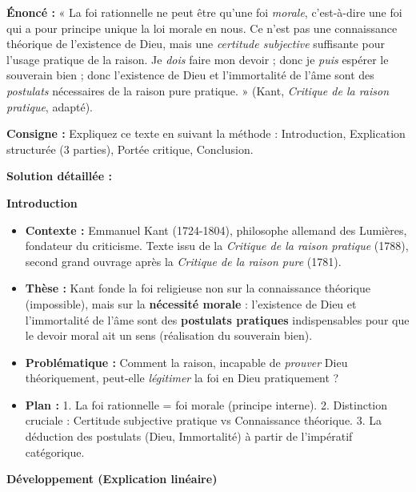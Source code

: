 \documentclass[11pt]{article}
\begin{document}
\begin{exoresolu}
\textbf{Énoncé :} « La foi rationnelle ne peut être qu'une foi \emph{morale}, c'est-à-dire une foi qui a pour principe unique la loi morale en nous. Ce n'est pas une connaissance théorique de l'existence de Dieu, mais une \emph{certitude subjective} suffisante pour l'usage pratique de la raison. Je \emph{dois} faire mon devoir ; donc je \emph{puis} espérer le souverain bien ; donc l'existence de Dieu et l'immortalité de l'âme sont des \emph{postulats} nécessaires de la raison pure pratique. » (Kant, \emph{Critique de la raison pratique}, adapté).

\textbf{Consigne :} Expliquez ce texte en suivant la méthode : Introduction, Explication structurée (3 parties), Portée critique, Conclusion.

\tcblower
\textbf{Solution détaillée :}

\textbf{Introduction}
\begin{itemize}
    \item \textbf{Contexte :} Emmanuel Kant (1724-1804), philosophe allemand des Lumières, fondateur du criticisme. Texte issu de la \emph{Critique de la raison pratique} (1788), second grand ouvrage après la \emph{Critique de la raison pure} (1781).
    \item \textbf{Thèse :} Kant fonde la foi religieuse non sur la connaissance théorique (impossible), mais sur la \textbf{nécessité morale} : l'existence de Dieu et l'immortalité de l'âme sont des \textbf{postulats pratiques} indispensables pour que le devoir moral ait un sens (réalisation du souverain bien).
    \item \textbf{Problématique :} Comment la raison, incapable de \emph{prouver} Dieu théoriquement, peut-elle \emph{légitimer} la foi en Dieu pratiquement ?
    \item \textbf{Plan :} 1. La foi rationnelle = foi morale (principe interne). 2. Distinction cruciale : Certitude subjective pratique vs Connaissance théorique. 3. La déduction des postulats (Dieu, Immortalité) à partir de l'impératif catégorique.
\end{itemize}

\textbf{Développement (Explication linéaire)}


\end{exoresolu}
\end{document}
